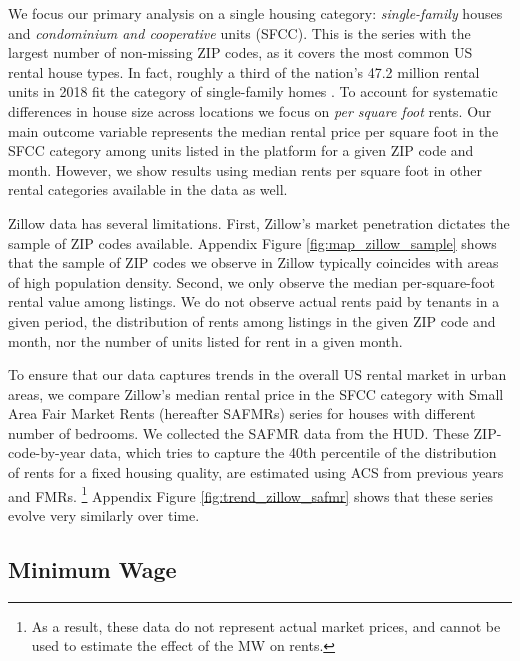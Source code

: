 We focus our primary analysis on a single housing category:
\textit{single-family} houses and \textit{condominium and cooperative} units (SFCC).
This is the series with the largest number of non-missing ZIP codes, as it 
covers the most common US rental house types.
In fact, roughly a third of the nation's 47.2 million rental units in 2018 fit 
the category of single-family homes \parencite{Fernald2020}.
To account for systematic differences in house size across locations we focus 
on \textit{per square foot} rents.
Our main outcome variable represents the median rental price per square foot in 
the SFCC category among units listed in the platform for a given ZIP code and 
month.
However, we show results using median rents per square foot in other rental 
categories available in the data as well.

Zillow data has several limitations.
First, Zillow's market penetration dictates the sample of ZIP codes available.
Appendix Figure \ref{fig:map_zillow_sample} shows that the sample of ZIP codes
we observe in Zillow typically coincides with areas of high population density.
Second, we only observe the median per-square-foot rental value among listings.
We do not observe actual rents paid by tenants in a given period, 
the distribution of rents among listings in the given ZIP code and month, nor
the number of units listed for rent in a given month.

To ensure that our data captures trends in the overall US rental market in 
urban areas, we compare Zillow's median rental price in the SFCC category with 
Small Area Fair Market Rents (hereafter SAFMRs) series for houses with 
different number of bedrooms.
We collected the SAFMR data from the HUD.
These ZIP-code-by-year data, which tries to capture the 40th percentile of the 
distribution of rents for a fixed housing quality, are estimated using ACS from
previous years and FMRs.%
\footnote{As a result, these data do not represent actual market prices, and 
cannot be used to estimate the effect of the MW on rents.}
%
%
Appendix Figure \ref{fig:trend_zillow_safmr} shows that these series evolve
very similarly over time.

\subsection{Minimum Wage}\label{sec:mw_construction}

